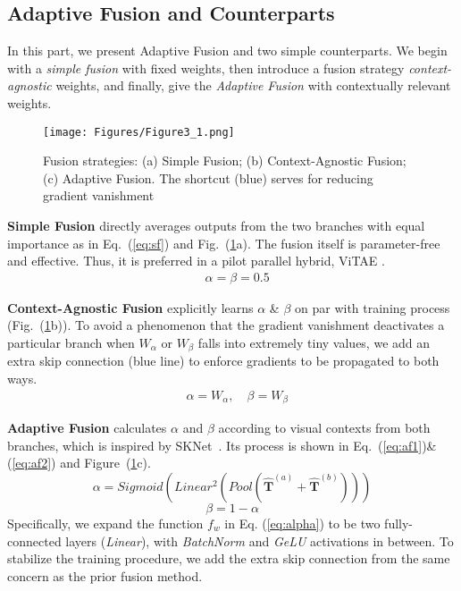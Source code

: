 \documentclass[lettersize,journal]{IEEEtran}
\begin{document}
\subsection{Adaptive Fusion and Counterparts}
\label{sec:adaptive}
In this part, we present Adaptive Fusion and two simple counterparts. We begin with a \textit{simple fusion} with fixed weights, then introduce a fusion strategy \textit{context-agnostic} weights, and finally, give the \textit{Adaptive Fusion} with contextually relevant weights.

\begin{figure}
\centering
\texttt{[image: Figures/Figure3\_1.png]}
\caption{Fusion strategies: (a) Simple Fusion; (b) Context-Agnostic Fusion; (c) Adaptive Fusion. The shortcut ({\color{blue}blue}) serves for reducing gradient vanishment}
\label{fig:fusion}
\end{figure}

\textbf{Simple Fusion} directly averages outputs from the two branches with equal importance as in Eq.~(\ref{eq:sf}) and Fig.~(\ref{fig:fusion}a). The fusion itself is parameter-free and effective. Thus, it is preferred in a pilot parallel hybrid, ViTAE \cite{Xu2021ViTAEVT}. 
\begin{align}
    & \alpha= \beta = 0.5 \label{eq:sf}
\end{align}

\textbf{Context-Agnostic Fusion} explicitly learns $\alpha$ \& $\beta$ on par with training process (Fig.~(\ref{fig:fusion}b)). To avoid a phenomenon that the gradient vanishment deactivates a particular branch when $W_\alpha$ or $W_\beta$ falls into extremely tiny values, we add an extra skip connection ({\color{blue}blue} line) to enforce gradients to be propagated to both ways.
\begin{align}
    & \alpha= W_\alpha,\quad \beta = W_\beta
\end{align}

\textbf{Adaptive Fusion} calculates $\alpha$ and $\beta$ according to visual contexts from both branches, which is inspired by SKNet~\cite{Li2019SelectiveKN}. Its process is shown in Eq.~(\ref{eq:af1})\&(\ref{eq:af2}) and Figure~(\ref{fig:fusion}c).  
\begin{equation}
    \alpha= Sigmoid\left(Linear^2\left(Pool\left(\boldsymbol{\hat{T}}^{(a)} + \boldsymbol{\hat{T}}^{(b)}\right)\right)\right)
    \label{eq:af1}
\end{equation}
\begin{equation}
    \beta = 1-\alpha
    \label{eq:af2}
\end{equation}
Specifically, we expand the function $f_w$ in Eq. (\ref{eq:alpha}) to be two fully-connected layers (\textit{Linear}), with \textit{BatchNorm} and \textit{GeLU} activations in between. To stabilize the training procedure, we add the extra skip connection from the same concern as the prior fusion method.
\end{document}
